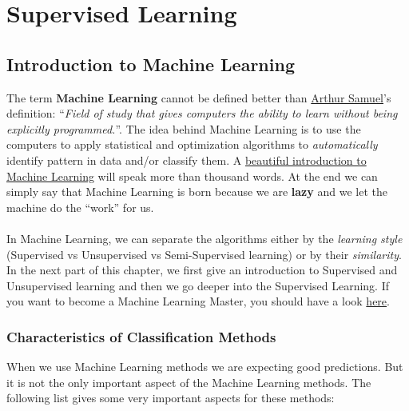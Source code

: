 

\section{Supervised Learning}

\subsection{Introduction to Machine Learning}

The term {\bf Machine Learning} cannot be defined better than \href{https://en.wikipedia.org/wiki/Arthur\_Samuel}{Arthur Samuel}'s definition: ``{\it Field of study that gives computers the ability to learn without being explicitly programmed.}''. The idea behind Machine Learning is to use the computers to apply statistical and optimization algorithms to \emph{automatically} identify pattern in data and/or classify them. A \href{http://www.r2d3.us/visual-intro-to-machine-learning-part-1/}{beautiful introduction to Machine Learning} will speak more than thousand words. At the end we can simply say that Machine Learning is born because we are \textbf{lazy} and we let the machine do the ``work'' for us. 
\\\\
In Machine Learning, we can separate the algorithms either by the \emph{learning style} (Supervised vs Unsupervised vs Semi-Supervised learning) or by their \emph{similarity}. In the next part of this chapter, we first give an introduction to Supervised and Unsupervised learning and then we go deeper into the Supervised Learning. If you want to become a Machine Learning Master, you should have a look \href{http://machinelearningmastery.com/}{here}.

\subsubsection{Characteristics of Classification Methods} 

When we use Machine Learning methods we are expecting good predictions. But it is not the only important aspect of the Machine Learning methods. The following list gives some very important aspects for these methods:

